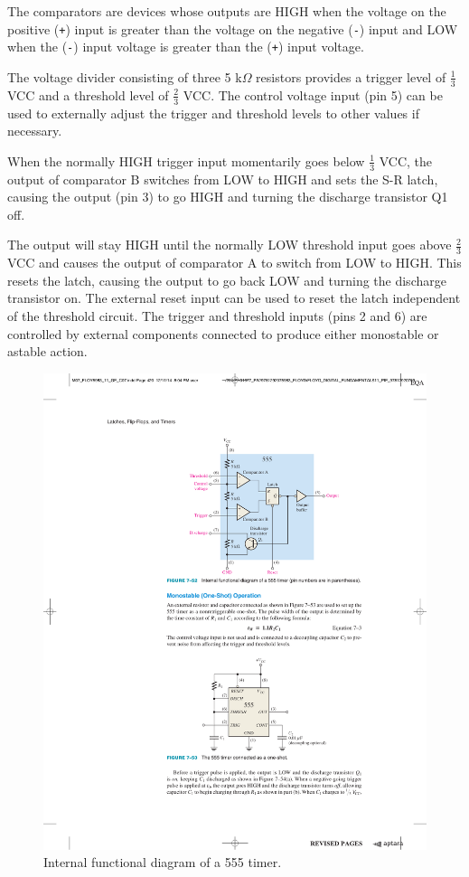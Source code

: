 \documentclass[a4paper, 11pt, oneside]{article}
\begin{document}
The comparators are devices whose outputs are HIGH when the voltage on the positive (\texttt{+}) input is greater than the voltage on the negative (\texttt{-}) input and LOW when the (\texttt{-}) input voltage is greater than the (\texttt{+}) input voltage. \medskip

The voltage divider consisting of three 5 k$\Omega$ resistors provides a trigger level of $\frac{1}{3}$ VCC and a threshold level of $\frac{2}{3}$ VCC. The control voltage input (pin 5) can be used to externally adjust the trigger and threshold levels to other values if necessary.\medskip 

When the normally HIGH trigger input momentarily goes below $\frac{1}{3}$ VCC, the output of comparator B switches from LOW to HIGH and sets the S-R latch, causing the output (pin 3) to go HIGH and turning the discharge transistor Q1 off.\medskip

The output will stay HIGH until the normally LOW threshold input goes above $\frac{2}{3}$ VCC and
causes the output of comparator A to switch from LOW to HIGH. This resets the latch,
causing the output to go back LOW and turning the discharge transistor on. The external
reset input can be used to reset the latch independent of the threshold circuit. The trigger
and threshold inputs (pins 2 and 6) are controlled by external components connected to
produce either monostable or astable action. ~\autocite{FLOYD}


\begin{figure}[H]
    \centering
    \includegraphics[scale = 0.99]{Graphics/Practice 2/GRAPHICS/555/GRAPHS/DATASHEETS/555_INTERNALS.pdf}
    \caption{Internal functional diagram of a 555 timer. ~\autocite{FLOYD}}
    \label{fig:555_DIAGRAM}
\end{figure}
\end{document}
